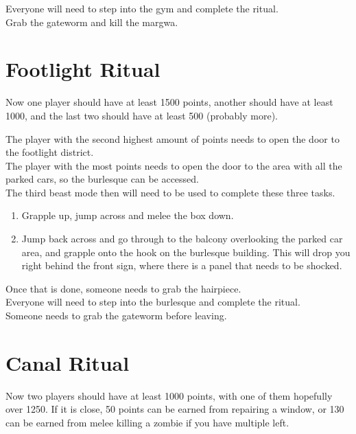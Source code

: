\documentclass[11pt]{article} %
\begin{document}
	Everyone will need to step into the gym and complete the ritual. \\

	Grab the gateworm and kill the margwa.

\newpage
\section{Footlight Ritual}
	
	Now one player should have at least 1500 points, another should have at least 1000, and the last two should have at least 500 (probably more).

	The player with the second highest amount of points needs to open the door to the footlight district. \\

	The player with the most points needs to open the door to the area with all the parked cars, so the burlesque can be accessed. \\

	The third beast mode then will need to be used to complete these three tasks.

	\begin{enumerate}
		\item Grapple up, jump across and melee the box down.
		\item Jump back across and go through to the balcony overlooking the parked car area, and grapple onto the hook on the burlesque building. This will drop you right behind the front sign, where there is a panel that needs to be shocked.
	\end{enumerate}

	Once that is done, someone needs to grab the hairpiece. \\

	Everyone will need to step into the burlesque and complete the ritual. \\

	Someone needs to grab the gateworm before leaving.

\newpage
\section{Canal Ritual}
	
	Now two players should have at least 1000 points, with one of them hopefully over 1250. If it is close, 50 points can be earned from repairing a window, or 130 can be earned from melee killing a zombie if you have multiple left. \\
\end{document}
